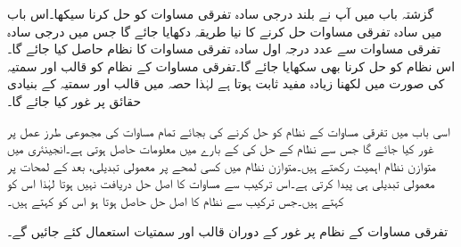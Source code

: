 گزشتہ باب میں آپ نے بلند درجی سادہ تفرقی مساوات کو حل کرنا سیکھا۔اس باب میں سادہ تفرقی مساوات حل کرنے کا نیا طریقہ دکھایا جائے گا جس میں  درجی سادہ تفرقی مساوات سے  عدد درجہ اول سادہ تفرقی مساوات کا نظام حاصل کیا جائے گا۔اس نظام کو حل کرنا بھی سکھایا جائے گا۔تفرقی مساوات کے نظام کو قالب اور سمتیہ کی صورت میں لکھنا زیادہ مفید ثابت ہوتا ہے لہٰذا حصہ  میں قالب اور سمتیہ کے بنیادی حقائق پر غور کیا جائے گا۔

اسی باب میں تفرقی مساوات کے نظام کو حل کرنے کی بجائے تمام مساوات کی مجموعی طرز عمل پر غور کیا جائے گا جس سے نظام کے حل کی  کے بارے میں معلومات حاصل ہوتی ہے۔انجینئری میں متوازن نظام  اہمیت رکھتے ہیں۔متوازن نظام میں کسی لمحے پر معمولی تبدیلی، بعد کے لمحات پر معمولی تبدیلی ہی پیدا کرتی ہے۔اس ترکیب سے مساوات کا اصل حل دریافت نہیں ہوتا لہٰذا اس کو  کہتے ہیں۔جس ترکیب سے نظام کا اصل حل حاصل ہوتا ہو اس کو  کہتے ہیں۔

 
تفرقی مساوات کے نظام پر غور کے دوران قالب اور سمتیات استعمال کئے جائیں گے۔

